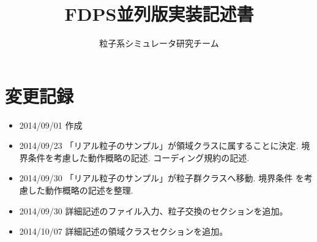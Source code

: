 \documentclass[12pt,a4paper]{jarticle}
\title{FDPS並列版実装記述書}
\author{粒子系シミュレータ研究チーム}
\date{}
\begin{document}
\maketitle
\tableofcontents

\newpage

\section{変更記録}
\begin{itemize}
\item 2014/09/01 作成
\item 2014/09/23 「リアル粒子のサンプル」が領域クラスに属することに決定.
  境界条件を考慮した動作概略の記述. コーディング規約の記述.
\item 2014/09/30 「リアル粒子のサンプル」が粒子群クラスへ移動. 境界条件
  を考慮した動作概略の記述を整理. 
\item 2014/09/30 詳細記述のファイル入力、粒子交換のセクションを追加。
\item 2014/10/07 詳細記述の領域クラスセクションを追加。
\end{itemize}

\newpage

\end{document}
